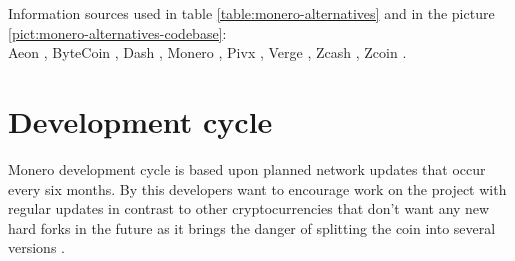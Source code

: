 \documentclass[
  printed, %
  table,   %
  nolof,     %
  nolot,     %
           oneside, color
]{fithesis3}
\begin{document}
Information sources used in table \ref{table:monero-alternatives} and in the picture \ref{pict:monero-alternatives-codebase}:\\
Aeon \cite{moneroalternativeaeon}, ByteCoin \cite{moneroalternativebytecoin}, Dash \cite{moneroalternativedash,moneroalternativedashdev}, Monero \cite{moneroprojectgithub}, Pivx \cite{moneroalternativepivx}, Verge \cite{moneroalternativeverge}, Zcash \cite{moneroalternativezcash}, Zcoin \cite{moneroalternativezcoin}.
\iffalse
\begin{figure}[H]
\centering
\begin{tikzpicture}[sibling distance=10em,
  every node/.style = {shape=rectangle, rounded corners,
    draw, align=center,
    top color=white, bottom color=blue!20}]]
  \node {Bytecoin}
	child { node {DASH} 
	child { node {PIVX}}}
    child { node {BitMonero}
      child { node {Monero}
        child { node {AEON} } } };
      \node[xshift=21mm]{Verge};
        \node[xshift=4cm] {Bitcoin}
	child[xshift=25mm] { node {Zcash}}
	child[xshift=0cm] { node {Zcoin}};  
\end{tikzpicture}
\caption{Codebase overview of the selected cryptocurrencies.}
\label{pict:monero-alternatives-codebase}
\end{figure}
\fi

\section{Development cycle}


Monero development cycle is based upon planned network updates that occur every six months. By this developers want to encourage work on the project with regular updates in contrast to other cryptocurrencies that don't want any new hard forks in the future as it brings the danger of splitting the coin into several versions \cite{mccorry2017atomically}.
\end{document}
